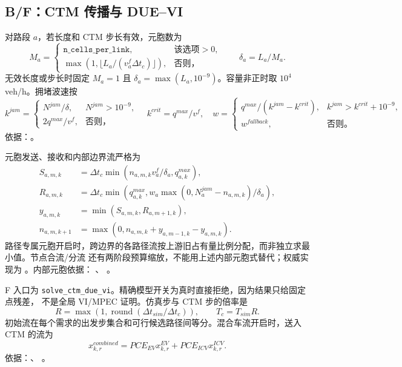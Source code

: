 \subsection{B/F：CTM 传播与 DUE--VI}
对路段 $a$，若长度和 CTM 步长有效，元胞数为
\begin{equation}
 M_a=\begin{cases}
 \texttt{n\_cells\_per\_link},&\text{该选项}>0,\\
 \max(1,\lfloor L_a/(v_a^f\Delta t_c)\rfloor),&\text{否则，}
 \end{cases}
 \qquad\delta_a=L_a/M_a.
\end{equation}
无效长度或步长时固定 $M_a=1$ 且 $\delta_a=\max(L_a,10^{-9})$。容量非正时取
$10^4$ veh/h。拥堵波速按
\begin{equation}
 k^{jam}=\begin{cases}N^{jam}/\delta,&N^{jam}>10^{-9},\\2q^{max}/v^f,&\text{否则，}\end{cases}
 \quad k^{crit}=q^{max}/v^f,
 \quad w=\begin{cases}q^{max}/(k^{jam}-k^{crit}),&k^{jam}>k^{crit}+10^{-9},\\
 w^{fallback},&\text{否则。}\end{cases}
\end{equation}
依据：。

元胞发送、接收和内部边界流严格为
\begin{align}
 S_{a,m,k}&=\Delta t_c\min(n_{a,m,k}v_a^f/\delta_a,q_{a,k}^{max}),\\
 R_{a,m,k}&=\Delta t_c\min(q_{a,k}^{max},
 w_a\max(0,N_a^{jam}-n_{a,m,k})/\delta_a),\\
 y_{a,m,k}&=\min(S_{a,m,k},R_{a,m+1,k}),\\
 n_{a,m,k+1}&=\max(0,n_{a,m,k}+y_{a,m-1,k}-y_{a,m,k}).
\end{align}
路径专属元胞开启时，跨边界的各路径流按上游旧占有量比例分配，而非独立求最小值。节点合流/分流
还有两阶段预算缩放，不能用上述内部元胞式替代；权威实现为
。内部元胞依据：
、
。

F 入口为 \texttt{solve\_ctm\_due\_vi}。精确模型开关为真时直接拒绝，因为结果只给固定点残差，
不是全局 VI/MPEC 证明。仿真步与 CTM 步的倍率是
\begin{equation}
 R=\max(1,\operatorname{round}(\Delta t_{sim}/\Delta t_c)),\qquad T_c=T_{sim}R.
\end{equation}
初始流在每个需求的出发步集合和可行候选路径间等分。混合车流开启时，送入 CTM 的流为
\begin{equation}
 x^{combined}_{k,r}=PCE_{EV}x^{EV}_{k,r}+PCE_{ICV}x^{ICV}_{k,r}.
\end{equation}
依据：、
。

